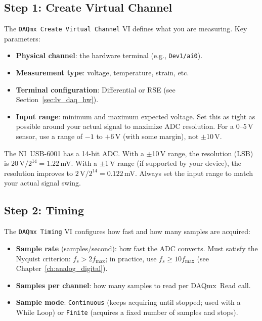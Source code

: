 \subsection{Step 1: Create Virtual Channel}

The \texttt{DAQmx Create Virtual Channel} VI defines what you are measuring. Key parameters:

\begin{itemize}[nosep,leftmargin=1.5em]
\item \textbf{Physical channel}: the hardware terminal (e.g., \texttt{Dev1/ai0}).
\item \textbf{Measurement type}: voltage, temperature, strain, etc.
\item \textbf{Terminal configuration}: Differential or RSE (see Section~\ref{sec:lv_daq_hw}).
\item \textbf{Input range}: minimum and maximum expected voltage. Set this as tight as possible around your actual signal to maximize ADC resolution. For a 0--5\,V sensor, use a range of $-1$ to $+6$\,V (with some margin), not $\pm$10\,V.
\end{itemize}

\begin{tipbox}
The NI~USB-6001 has a 14-bit ADC. With a $\pm$10\,V range, the resolution (LSB) is $20\,\text{V}/2^{14} = 1.22$\,mV. With a $\pm$1\,V range (if supported by your device), the resolution improves to $2\,\text{V}/2^{14} = 0.122$\,mV. Always set the input range to match your actual signal swing.
\end{tipbox}

\subsection{Step 2: Timing}

The \texttt{DAQmx Timing} VI configures how fast and how many samples are acquired:

\begin{itemize}[nosep,leftmargin=1.5em]
\item \textbf{Sample rate} (samples/second): how fast the ADC converts. Must satisfy the Nyquist criterion: $f_s > 2 f_{\max}$; in practice, use $f_s \geq 10 f_{\max}$ (see Chapter~\ref{ch:analog_digital}).
\item \textbf{Samples per channel}: how many samples to read per DAQmx~Read call.
\item \textbf{Sample mode}: \texttt{Continuous} (keeps acquiring until stopped; used with a While Loop) or \texttt{Finite} (acquires a fixed number of samples and stops).
\end{itemize}

